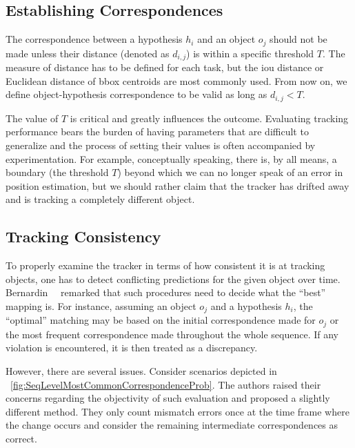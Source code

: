 \subsection{Establishing Correspondences}

The correspondence between a hypothesis $h_i$ and an object $o_j$ should not be made unless their distance (denoted as $d_{i,j}$) is within a specific threshold $T$. The measure of distance has to be defined for each task, but the \gls{iou} distance or Euclidean distance of \gls{bbox} centroids are most commonly used. From now on, we define object-hypothesis correspondence to be valid as long as $d_{i,j} < T$.

The value of $T$ is critical and greatly influences the outcome. Evaluating tracking performance bears the burden of having parameters that are difficult to generalize and the process of setting their values is often accompanied by experimentation. For example, conceptually speaking, there is, by all means, a boundary (the threshold $T$) beyond which we can no longer speak of an error in position estimation, but we should rather claim that the tracker has drifted away and is tracking a completely different object.

\subsection{Tracking Consistency}

To properly examine the tracker in terms of how consistent it is at tracking objects, one has to detect conflicting predictions for the given object over time. Bernardin~\etal{}~\cite{bernardin2008clearmot} remarked that such procedures need to decide what the ``best'' mapping is. For instance, assuming an object $o_j$ and a hypothesis $h_i$, the ``optimal'' matching may be based on the initial correspondence made for $o_j$ or the most frequent correspondence made throughout the whole sequence. If any violation is encountered, it is then treated as a discrepancy.

However, there are several issues. Consider scenarios depicted in \figtext{}~\ref{fig:SeqLevelMostCommonCorrespondenceProb}. The authors raised their concerns regarding the objectivity of such evaluation and proposed a slightly different method. They only count mismatch errors once at the time frame where the change occurs and consider the remaining intermediate correspondences as correct.

